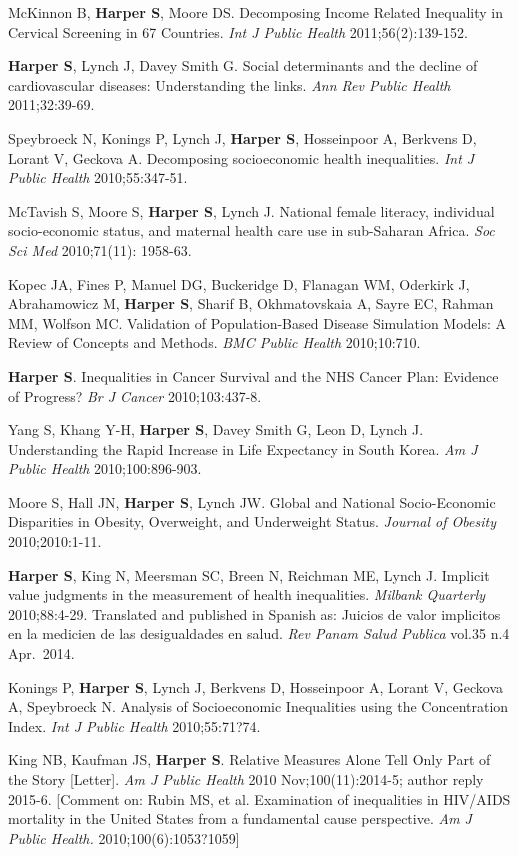 \documentclass[
  letterpaper,
  DIV=11,
  numbers=noendperiod]{scrartcl}
\begin{document}
McKinnon B, \textbf{Harper S}, Moore DS. Decomposing Income Related
Inequality in Cervical Screening in 67 Countries. \emph{Int J Public
Health} 2011;56(2):139-152.

\textbf{Harper S}, Lynch J, Davey Smith G. Social determinants and the
decline of cardiovascular diseases: Understanding the links. \emph{Ann
Rev Public Health} 2011;32:39-69.

Speybroeck N, Konings P, Lynch J, \textbf{Harper S}, Hosseinpoor A,
Berkvens D, Lorant V, Geckova A. Decomposing socioeconomic health
inequalities. \emph{Int J Public Health} 2010;55:347-51.

McTavish S, Moore S, \textbf{Harper S}, Lynch J. National female
literacy, individual socio-economic status, and maternal health care use
in sub-Saharan Africa. \emph{Soc Sci Med} 2010;71(11): 1958-63.

Kopec JA, Fines P, Manuel DG, Buckeridge D, Flanagan WM, Oderkirk J,
Abrahamowicz M, \textbf{Harper S}, Sharif B, Okhmatovskaia A, Sayre EC,
Rahman MM, Wolfson MC. Validation of Population-Based Disease Simulation
Models: A Review of Concepts and Methods. \emph{BMC Public Health}
2010;10:710.

\textbf{Harper S}. Inequalities in Cancer Survival and the NHS Cancer
Plan: Evidence of Progress? \emph{Br J Cancer} 2010;103:437-8.

Yang S, Khang Y-H, \textbf{Harper S}, Davey Smith G, Leon D, Lynch J.
Understanding the Rapid Increase in Life Expectancy in South Korea.
\emph{Am J Public Health} 2010;100:896-903.

Moore S, Hall JN, \textbf{Harper S}, Lynch JW. Global and National
Socio-Economic Disparities in Obesity, Overweight, and Underweight
Status. \emph{Journal of Obesity} 2010;2010:1-11.

\textbf{Harper S}, King N, Meersman SC, Breen N, Reichman ME, Lynch J.
Implicit value judgments in the measurement of health inequalities.
\emph{Milbank Quarterly} 2010;88:4-29. Translated and published in
Spanish as: Juicios de valor implicitos en la medicien de las
desigualdades en salud. \emph{Rev Panam Salud Publica} vol.35 n.4
Apr.~2014.

Konings P, \textbf{Harper S}, Lynch J, Berkvens D, Hosseinpoor A, Lorant
V, Geckova A, Speybroeck N. Analysis of Socioeconomic Inequalities using
the Concentration Index. \emph{Int J Public Health} 2010;55:71?74.

King NB, Kaufman JS, \textbf{Harper S}. Relative Measures Alone Tell
Only Part of the Story {[}Letter{]}. \emph{Am J Public Health} 2010
Nov;100(11):2014-5; author reply 2015-6. {[}Comment on: Rubin MS, et al.
Examination of inequalities in HIV/AIDS mortality in the United States
from a fundamental cause perspective. \emph{Am J Public Health.}
2010;100(6):1053?1059{]}
\end{document}
